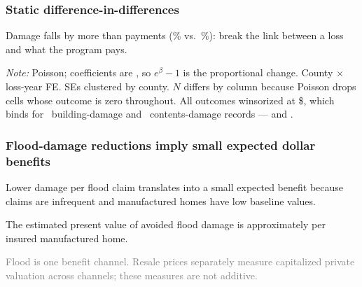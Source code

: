 \documentclass[11pt,xcolor={dvipsnames},hyperref={pdftex,pdfpagemode=UseNone,hidelinks,pdfdisplaydoctitle=true},usepdftitle=false,aspectratio=169]{beamer}
\newcommand{\gc}[1]{{\footnotesize\textcolor{gray}{#1}}}
\begin{document}
\begin{frame}
    \frametitle{Static difference-in-differences}

    \vspace{-0.5em}

    \tiny{
        \begin{table}
        \centering
        \resizebox{.85\linewidth}{!}{}
        \end{table}
    }

    \vspace{0.3em}

    \scriptsize{
    Damage falls by more than payments (\vBldgDmgPct\% vs.\ \vNetBldgPmtPct\%):  break the link between a loss and what the program pays.
    }

    \vspace{0.3em}

    \tiny{\emph{Note:} Poisson; coefficients are , so $e^{\beta}-1$ is the proportional change. County $\times$ loss-year FE. SEs clustered by county. $N$ differs by column because Poisson drops cells whose outcome is zero throughout. All outcomes winsorized at \$\vWinsorCap, which binds for \vWinsorNBldg\ building-damage and \vWinsorNCont\ contents-damage records --- and .} \hfill \hyperlink{frame:levels-logs}{}
\end{frame}









\begin{frame}
    \frametitle{Flood-damage reductions imply small expected dollar benefits}
    Lower damage per flood claim translates into a small expected benefit because claims are infrequent and manufactured homes have low baseline values.

    \vspace{1em}
    The estimated present value of avoided flood damage is approximately \al{\$\vClFloodPV} per insured manufactured home.

    \vspace{1em}
    \gc{Flood is one benefit channel. Resale prices separately measure capitalized private valuation across channels; these measures are not additive.}
\end{frame}
\end{document}
